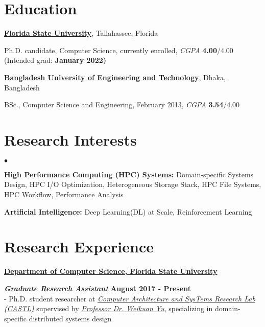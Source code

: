 \documentclass[margin,line]{res}
\newenvironment{list1}{
  \begin{list}{\ding{113}}{%
      \setlength{\itemsep}{0in}
      \setlength{\parsep}{0in} \setlength{\parskip}{0in}
      \setlength{\topsep}{0in} \setlength{\partopsep}{0in} 
      \setlength{\leftmargin}{0.17in}}}{\end{list}}
\newenvironment{list2}{
  \begin{list}{$\bullet$}{%
      \setlength{\itemsep}{0in}
      \setlength{\parsep}{0in} \setlength{\parskip}{0in}
      \setlength{\topsep}{0in} \setlength{\partopsep}{0in} 
      \setlength{\leftmargin}{0.2in}}}{\end{list}}
\begin{document}
\begin{resume}

\section{\sc Education}
{\bf \href{http://www.fsu.edu}{Florida State University}}, Tallahassee, Florida\\
\vspace*{-.15in}
\begin{list1}
\item[] Ph.D. candidate, Computer Science, currently enrolled, \textit{CGPA} \textbf{4.00}/4.00 (Intended grad: \bf{January 2022})
\end{list1}
\vspace*{-.15in}
{\bf \href{http://buet.ac.bd}{Bangladesh University of Engineering and Technology}}, Dhaka, Bangladesh\\
\vspace*{-.15in}
\begin{list1}
\item[] BSc., Computer Science and Engineering, February 2013, \textit{CGPA} \textbf{3.54}/4.00
\end{list1}

\vspace*{-.1in}

\section{\sc Research Interests}
\begin{list2}
\item \textbf{High Performance Computing (HPC) Systems:} Domain-specific Systems Design, HPC I/O Optimization, Heterogeneous Storage Stack, HPC File Systems, HPC Workflow, Performance Analysis
\item \textbf{Artificial Intelligence:} Deep Learning(DL) at Scale, Reinforcement Learning
\end{list2}

\vspace*{-.1in}

\section{\sc Research Experience}
{\bf \href{http://www.cs.fsu.edu/}{Department of Computer Science, Florida State University}}

\vspace{-.4cm}
\textbf{{\em Graduate Research Assistant}} \hfill {\bf August 2017 - Present}\\
- Ph.D. student researcher at \textit{\href{http://castl.cs.fsu.edu/doku.php/}{Computer Architecture and SysTems Research Lab (CASTL)}} supervised by \textit{\href{https://www.cs.fsu.edu/~yuw/}{Professor Dr. Weikuan Yu}}, specializing in domain-specific distributed systems design


\end{resume}
\end{document}
